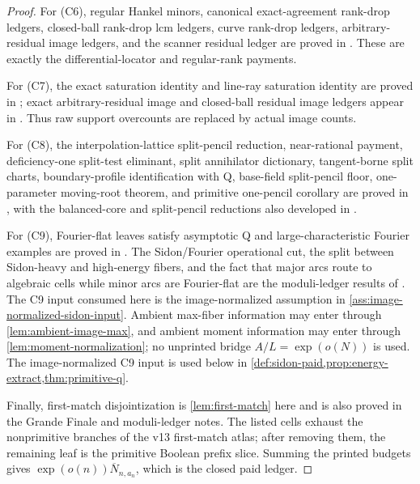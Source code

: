\documentclass[11pt,a4paper]{amsart}
\numberwithin{equation}{section}
\theoremstyle{remark}
\newcommand{\barN}{\overline N}
\begin{document}
\begin{proof}
For \textup{(C6)}, regular Hankel minors, canonical exact-agreement rank-drop ledgers, closed-ball rank-drop lcm ledgers, curve rank-drop ledgers, arbitrary-residual image ledgers, and the scanner residual ledger are proved in \cite[Hankel, rank-drop, curve, residual-image, and scanner ledgers]{Cho26CapV13}.  These are exactly the differential-locator and regular-rank payments.

For \textup{(C7)}, the exact saturation identity and line-ray saturation identity are proved in \cite[saturation and line-ray saturation identities]{Cho26Grande}; exact arbitrary-residual image and closed-ball residual image ledgers appear in \cite[residual image ledgers]{Cho26CapV13}.  Thus raw support overcounts are replaced by actual image counts.

For \textup{(C8)}, the interpolation-lattice split-pencil reduction, near-rational payment, deficiency-one split-test eliminant, split annihilator dictionary, tangent-borne split charts, boundary-profile identification with Q, base-field split-pencil floor, one-parameter moving-root theorem, and primitive one-pencil corollary are proved in \cite[split-pencil and BC sections]{Cho26Grande}, with the balanced-core and split-pencil reductions also developed in \cite[rank-one and split-pencil reductions]{Cho26CapV13}.

For \textup{(C9)}, Fourier-flat leaves satisfy asymptotic Q and large-characteristic Fourier examples are proved in \cite[Fourier-flat Q section]{Cho26Grande}.  The Sidon/Fourier operational cut, the split between Sidon-heavy and high-energy fibers, and the fact that major arcs route to algebraic cells while minor arcs are Fourier-flat are the moduli-ledger results of \cite{Cho26ModuliFinal,Cho26ModuliSelf}.  The C9 input consumed here is the image-normalized assumption in \cref{ass:image-normalized-sidon-input}.  Ambient max-fiber information may enter through \cref{lem:ambient-image-max}, and ambient moment information may enter through \cref{lem:moment-normalization}; no unprinted bridge \(A/L=\exp(o(N))\) is used.  The image-normalized C9 input is used below in \cref{def:sidon-paid,prop:energy-extract,thm:primitive-q}.

Finally, first-match disjointization is \cref{lem:first-match} here and is also proved in the Grande Finale and moduli-ledger notes.  The listed cells exhaust the nonprimitive branches of the v13 first-match atlas; after removing them, the remaining leaf is the primitive Boolean prefix slice.  Summing the printed budgets gives \(\exp(o(n))\barN_{n,a_n}\), which is the closed paid ledger.
\end{proof}
\end{document}
